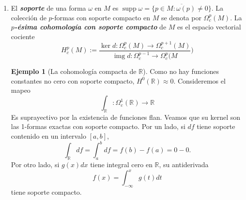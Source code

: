 \documentclass[spanish]{article}
\theoremstyle{definition}
\newtheorem*{ejem}{Ejemplo}
\newcommand{\R}{\mathbb{R}}
\DeclareMathOperator{\img}{img}
\DeclareMathOperator{\supp}{supp}
\begin{document}
\begin{enumerate}
\begin{enumerate}
			\item (Mayer-Vietoris). Supongamos que $\{U,V\}$ es una cubierta abierta de $M$. Las inclusiones
			\[\begin{tikzcd}[column sep=small,row sep=small]
				&U\arrow[dr,"k"]\\
				U\cap V\arrow[ru,"i"]\arrow[dr,swap,"j"]&&M\\
				&V\arrow[ru,swap,"l"]
			\end{tikzcd}\]
			inducen la siguiente sucesión exacta larga en cohomología:
			\[\begin{tikzcd}[column sep=small]
				\cdots\arrow[r,"\delta"]&H_{dR}^p(M)\arrow[r,"k^*\oplus l^*"]&H_{dR}^p(U)\oplus H_{dR}^p(V)\arrow[r,"i^*-j^*"]&H_{dR}^p(U\cap V)\arrow[r,"\delta"]&H_{dR}^{p+1}(M)\arrow[r,"k^*\oplus l^*"]&\cdots
			\end{tikzcd}\]
		\end{enumerate}
		
		\item El \textbf{\textit{soporte}} de una forma $\omega$ en $M$ es $\supp \omega=\overline{\{p\in M:\omega(p)\neq0\}}$. La colección de $p$-formas con soporte compacto en $M$ se denota por $\Omega_c^p(M)$. La \textbf{\textit{$p$-ésima cohomología con soporte compacto}} de $M$ es el espacio vectorial cociente
		\[H^p_c(M):=\frac{\ker d:\Omega_c^p(M)\to \Omega_c^{p+1}(M)}{\img d:\Omega_c^{p-1}\to\Omega_c^p(M})\]
			\begin{ejem}[La cohomología compacta de $\R$]
			Como no hay funciones constantes no cero con soporte compacto, $H^0(\R)\approx 0$. Consideremos el mapeo
			\[\int_\R:\Omega_c^1(\R)\to\R\]
			Es suprayectivo por la existencia de funciones flan. Veamos que su kernel son las 1-formas exactas con soporte compacto. Por un lado, si $df$ tiene soporte contenido en un intervalo $[a,b]$,
			\[\int_\R df=\int_a^bdf=f(b)-f(a)=0-0.\]
			Por otro lado, si $g(x)dx$ tiene integral cero en $\R$, su antiderivada
			\[f(x)=\int_{-\infty}^xg(t)dt\]
			tiene soporte compacto.			
		\end{ejem}
	\end{enumerate}

	\iffalse
	\begin{ejem}
		En general,
		\[H^p_c(\R^n)\approx\begin{cases}
			\begin{aligned}
				0\qquad&\text{si }p< n\\
				\R\qquad&\text{si }p=n
			\end{aligned}
		\end{cases}\]
	\end{ejem}
	\fi
	
\end{document}
